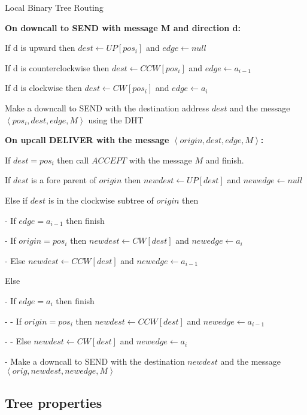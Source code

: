 \documentclass[12pt,english,journal]{elsarticle}
\numberwithin{equation}{section}
\numberwithin{figure}{section}
\theoremstyle{plain}
\theoremstyle{plain}
\begin{document}
\begin{algorithm*}
\caption{\label{alg:CCWandCW}Local Binary Tree Routing}


\textbf{On downcall to SEND with message M and direction d:}

If d is upward then $dest\leftarrow UP\left[pos_{i}\right]$ and $edge\leftarrow null$

If d is counterclockwise then $dest\leftarrow CCW\left[pos_{i}\right]$
and $edge\leftarrow a_{i-1}$

If d is clockwise then $dest\leftarrow CW\left[pos_{i}\right]$ and
$edge\leftarrow a_{i}$

Make a downcall to SEND with the destination address $dest$ and the
message $\left\langle pos_{i},dest,edge,M\right\rangle $ using the
DHT

\textbf{On upcall DELIVER with the message $\left\langle origin,dest,edge,M\right\rangle $:}

If $dest=pos_{i}$ then call $ACCEPT$ with the message $M$ and finish.

If $dest$ is a fore parent of $origin$ then $newdest\leftarrow UP\left[dest\right]$
and $newedge\leftarrow null$

Else if $dest$ is in the clockwise subtree of $origin$ then

- If $edge=a_{i-1}$ then finish

- If $origin=pos_{i}$ then $newdest\leftarrow CW\left[dest\right]$
and $newedge\leftarrow a_{i}$

- Else $newdest\leftarrow CCW\left[dest\right]$ and $newedge\leftarrow a_{i-1}$

Else

- If $edge=a_{i}$ then finish

- - If $origin=pos_{i}$ then $newdest\leftarrow CCW\left[dest\right]$
and $newedge\leftarrow a_{i-1}$

- - Else $newdest\leftarrow CW\left[dest\right]$ and $newedge\leftarrow a_{i}$

- Make a downcall to SEND with the destination $newdest$ and the
message $\left\langle orig,newdest,newedge,M\right\rangle $
\end{algorithm*}



\subsection{Tree properties}
\end{document}
